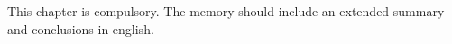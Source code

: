 

This chapter is compulsory.
The memory should include an extended summary and conclusions in english. 
